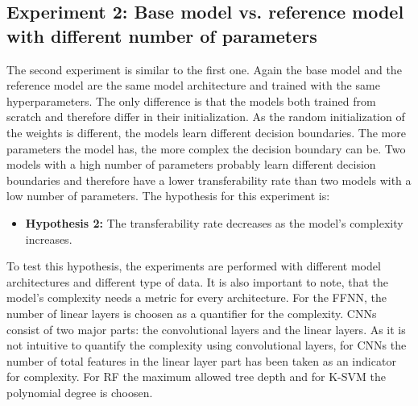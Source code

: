 \documentclass{article}
\begin{document}
\subsection{Experiment 2: Base model vs. reference model with different number of parameters}
The second experiment is similar to the first one. Again the base model and the reference model are the same model architecture and trained with the same hyperparameters. The only difference is that the models both trained from scratch and therefore differ in their initialization. As the random initialization of the weights is different, the models learn different decision boundaries. The more parameters the model has, the more complex the decision boundary can be. Two models with a high number of parameters probably learn different decision boundaries and therefore have a lower transferability rate than two models with a low number of parameters. The hypothesis for this experiment is:
\begin{itemize}
    \item \textbf{Hypothesis 2:} The transferability rate decreases as the model's complexity increases.
\end{itemize}
To test this hypothesis, the experiments are performed with different model architectures and different type of data. It is also important to note, that the model's complexity needs a metric for every architecture. For the FFNN, the number of linear layers is choosen as a quantifier for the complexity. CNNs consist of two major parts: the convolutional layers and the linear layers. As it is not intuitive to quantify the complexity using convolutional layers, for CNNs the number of total features in the linear layer part has been taken as an indicator for complexity. For RF the maximum allowed tree depth and for K-SVM the polynomial degree is choosen.
\end{document}
